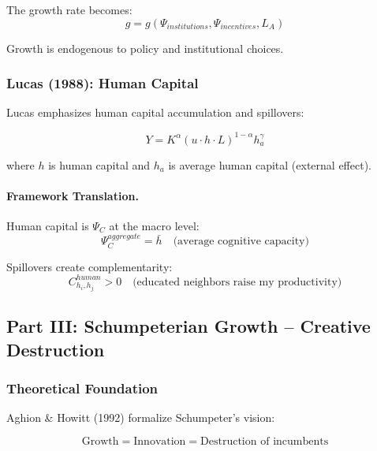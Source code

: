 The growth rate becomes:
\begin{equation}
g = g(\Psi_{institutions}, \Psi_{incentives}, L_A)
\end{equation}

Growth is endogenous to policy and institutional choices.

\subsubsection{Lucas (1988): Human Capital}

Lucas emphasizes human capital accumulation and spillovers:

\begin{equation}
Y = K^\alpha (u \cdot h \cdot L)^{1-\alpha} h_a^\gamma
\end{equation}

where $h$ is human capital and $h_a$ is average human capital (external effect).

\paragraph{Framework Translation.}
Human capital is $\Psi_C$ at the macro level:
\begin{equation}
\Psi_C^{aggregate} = \bar{h} \quad \text{(average cognitive capacity)}
\end{equation}

Spillovers create complementarity:
\begin{equation}
C_{h_i, h_j}^{human} > 0 \quad \text{(educated neighbors raise my productivity)}
\end{equation}

\subsection{Part III: Schumpeterian Growth – Creative Destruction}

\subsubsection{Theoretical Foundation}

Aghion \& Howitt (1992) formalize Schumpeter's vision:

\begin{equation}
\boxed{
\text{Growth} = \text{Innovation} = \text{Destruction of incumbents}
}
\label{eq:creative-destruction}
\end{equation}

